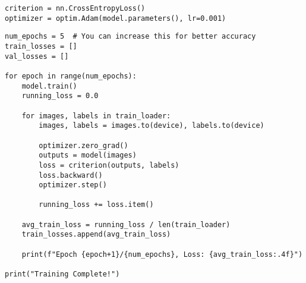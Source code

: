 \documentclass{article}
\begin{document}
\begin{verbatim}
criterion = nn.CrossEntropyLoss()
optimizer = optim.Adam(model.parameters(), lr=0.001)

\end{verbatim}

\begin{verbatim}
num_epochs = 5  # You can increase this for better accuracy
train_losses = []
val_losses = []

for epoch in range(num_epochs):
    model.train()
    running_loss = 0.0

    for images, labels in train_loader:
        images, labels = images.to(device), labels.to(device)

        optimizer.zero_grad()
        outputs = model(images)
        loss = criterion(outputs, labels)
        loss.backward()
        optimizer.step()

        running_loss += loss.item()

    avg_train_loss = running_loss / len(train_loader)
    train_losses.append(avg_train_loss)

    print(f"Epoch {epoch+1}/{num_epochs}, Loss: {avg_train_loss:.4f}")

print("Training Complete!")

\end{verbatim}
\end{document}
